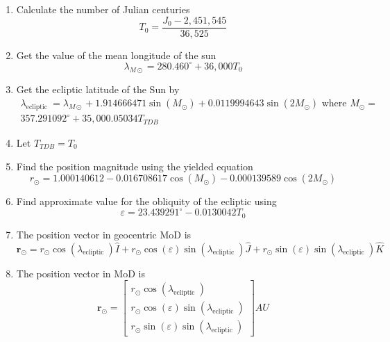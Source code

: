  \begin{enumerate}
     \item Calculate the number of Julian centuries
     \begin{equation}
         T_{0}=\frac{J_{0}-2,451,545}{36,525}
     \end{equation}
    \item Get the value of the mean longitude of the sun
    \begin{equation}
         \lambda_{M \odot}=280.460^{\circ}+36,000 T_{0}
     \end{equation}
    \item Get the ecliptic latitude of the Sun by
    \begin{equation}
         \begin{gathered}
            \lambda_{\text {ecliptic }}=\lambda_{M \odot}+1.914666471 \sin \left(M_{\odot}\right)+0.0119994643 \sin \left(2 M_{\odot}\right) \text { where } M_{\odot}= \\
            357.291092^{\circ}+35,000.05034 T_{T D B}
        \end{gathered}
     \end{equation}
    \item Let $T_{T D B}=T_{0}$
    \item Find the position magnitude using the yielded equation
    \begin{equation}
         r_{\odot}=1.000140612-0.016708617 \cos \left(M_{\odot}\right)-0.000139589 \cos \left(2 M_{\odot}\right)
     \end{equation}
    \item Find approximate value for the obliquity of the ecliptic using
    \begin{equation}
         \varepsilon=23.439291^{\circ}-0.0130042 T_{0}
     \end{equation}
    \item The position vector in geocentric MoD is
    \begin{equation}
         \boldsymbol{r_{\odot}}=r_{\odot} \cos \left(\lambda_{\text {ecliptic }}\right) \hat{I}+r_{\odot} \cos (\varepsilon) \sin \left(\lambda_{\text {ecliptic }}\right) \hat{J}+r_{\odot} \sin (\varepsilon) \sin \left(\lambda_{\text {ecliptic }}\right) \widehat{K}
     \end{equation}
    \item The position vector in MoD is
    \begin{equation}
         \boldsymbol{r_{\odot}}=  \begin{bmatrix}
           r_{\odot} \cos \left(\lambda_{\text {ecliptic }}\right) \\
           r_{\odot} \cos (\varepsilon) \sin \left(\lambda_{\text {ecliptic }}\right)\\
           r_{\odot} \sin (\varepsilon) \sin \left(\lambda_{\text {ecliptic }}\right)
         \end{bmatrix} A U
     \end{equation}
 \end{enumerate}

